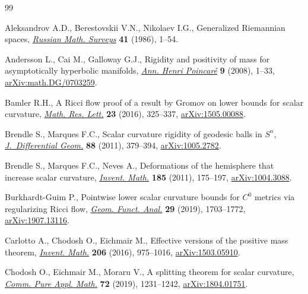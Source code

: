 \documentclass[pdftex]{sigma}
\numberwithin{equation}{section}
\theoremstyle{definition}
\begin{document}
\begin{thebibliography}{99}
\footnotesize\itemsep=0pt

Aleksandrov A.D., Berestovskii V.N., Nikolaev I.G., Generalized {R}iemannian
 spaces, \href{https://doi.org/10.1070/RM1986v041n03ABEH003311}{\textit{Russian Math. Surveys}} \textbf{41} (1986), 1--54.

Andersson L., Cai M., Galloway G.J., Rigidity and positivity of mass for
 asymptotically hyperbolic manifolds, \href{https://doi.org/10.1007/s00023-007-0348-2}{\textit{Ann. Henri Poincar\'e}}
 \textbf{9} (2008), 1--33, \href{https://arxiv.org/abs/math.DG/0703259}{arXiv:math.DG/0703259}.

Bamler R.H., A {R}icci flow proof of a result by {G}romov on lower bounds for
 scalar curvature, \href{https://doi.org/10.4310/MRL.2016.v23.n2.a2}{\textit{Math. Res. Lett.}} \textbf{23} (2016), 325--337,
 \href{https://arxiv.org/abs/1505.00088}{arXiv:1505.00088}.

Brendle S., Marques F.C., Scalar curvature rigidity of geodesic balls in
 {$S^n$}, \href{https://doi.org/10.4310/jdg/1321366355}{\textit{J.~Differential Geom.}} \textbf{88} (2011), 379--394,
 \href{https://arxiv.org/abs/1005.2782}{arXiv:1005.2782}.

Brendle S., Marques F.C., Neves A., Deformations of the hemisphere that
 increase scalar curvature, \href{https://doi.org/10.1007/s00222-010-0305-4}{\textit{Invent. Math.}} \textbf{185} (2011),
 175--197, \href{https://arxiv.org/abs/1004.3088}{arXiv:1004.3088}.

Burkhardt-Guim P., Pointwise lower scalar curvature bounds for {$C^0$} metrics
 via regularizing {R}icci flow, \href{https://doi.org/10.1007/s00039-019-00514-3}{\textit{Geom. Funct. Anal.}} \textbf{29}
 (2019), 1703--1772, \href{https://arxiv.org/abs/1907.13116}{arXiv:1907.13116}.

Carlotto A., Chodosh O., Eichmair M., Effective versions of the positive mass
 theorem, \href{https://doi.org/10.1007/s00222-016-0667-3}{\textit{Invent. Math.}} \textbf{206} (2016), 975--1016,
 \href{https://arxiv.org/abs/1503.05910}{arXiv:1503.05910}.

Chodosh O., Eichmair M., Moraru V., A splitting theorem for scalar curvature,
 \href{https://doi.org/10.1002/cpa.21803}{\textit{Comm. Pure Appl. Math.}} \textbf{72} (2019), 1231--1242,
 \href{https://arxiv.org/abs/1804.01751}{arXiv:1804.01751}.


\end{thebibliography}
\end{document}
